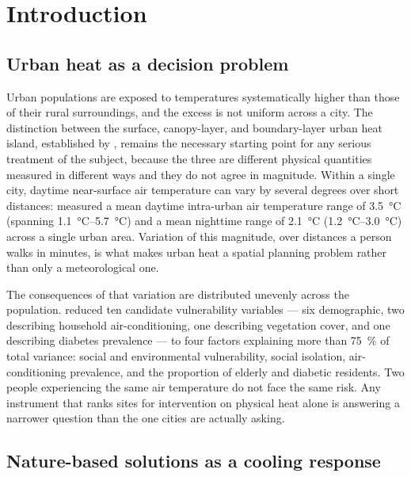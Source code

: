 \section{Introduction}
\label{sec:introduction}

\subsection{Urban heat as a decision problem}

Urban populations are exposed to temperatures systematically higher than those
of their rural surroundings, and the excess is not uniform across a city. The
distinction between the surface, canopy-layer, and boundary-layer urban heat
island, established by \textcite{oke1976}, remains the necessary starting point
for any serious treatment of the subject, because the three are different
physical quantities measured in different ways and they do not agree in
magnitude. Within a single city, daytime near-surface air temperature can vary
by several degrees over short distances: \textcite{ziter2019} measured a mean
daytime intra-urban air temperature range of \SI{3.5}{\degreeCelsius} (spanning
\SIrange{1.1}{5.7}{\degreeCelsius}) and a mean nighttime range of
\SI{2.1}{\degreeCelsius} (\SIrange{1.2}{3.0}{\degreeCelsius}) across a single
urban area. Variation of this magnitude, over distances a person walks in
minutes, is what makes urban heat a spatial planning problem rather than only a
meteorological one.

The consequences of that variation are distributed unevenly across the
population. \textcite{reid2009} reduced ten candidate vulnerability variables ---
six demographic, two describing household air-conditioning, one describing
vegetation cover, and one describing diabetes prevalence --- to four factors
explaining more than \SI{75}{\percent} of total variance: social and
environmental vulnerability, social isolation, air-conditioning prevalence, and
the proportion of elderly and diabetic residents. Two people experiencing the
same air temperature do not face the same risk. Any instrument that ranks sites
for intervention on physical heat alone is answering a narrower question than
the one cities are actually asking.

\subsection{Nature-based solutions as a cooling response}

